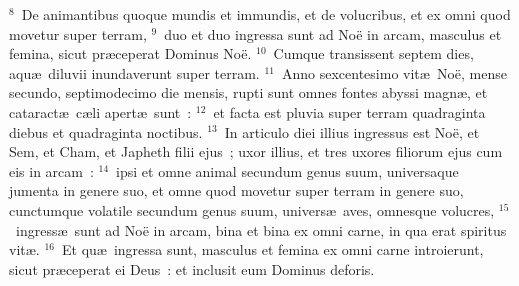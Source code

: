 ${}^{8}$~De animantibus quoque mundis et immundis, et de volucribus, et ex omni quod movetur super terram,
${}^{9}$~duo et duo ingressa sunt ad No\"e in arcam, masculus et femina, sicut pr\ae ceperat Dominus No\"e.
${}^{10}$~Cumque transissent septem dies, aqu\ae\ diluvii inundaverunt super terram.
${}^{11}$~Anno sexcentesimo vit\ae\ No\"e, mense secundo, septimodecimo die mensis, rupti sunt omnes fontes abyssi magn\ae , et cataract\ae\ c\ae li apert\ae\ sunt~:
${}^{12}$~et facta est pluvia super terram quadraginta diebus et quadraginta noctibus.
${}^{13}$~In articulo diei illius ingressus est No\"e, et Sem, et Cham, et Japheth filii ejus~; uxor illius, et tres uxores filiorum ejus cum eis in arcam~:
${}^{14}$~ipsi et omne animal secundum genus suum, universaque jumenta in genere suo, et omne quod movetur super terram in genere suo, cunctumque volatile secundum genus suum, univers\ae\ aves, omnesque volucres,
${}^{15}$~ingress\ae\ sunt ad No\"e in arcam, bina et bina ex omni carne, in qua erat spiritus vit\ae .
${}^{16}$~Et qu\ae\ ingressa sunt, masculus et femina ex omni carne introierunt, sicut pr\ae ceperat ei Deus~: et inclusit eum Dominus deforis.


